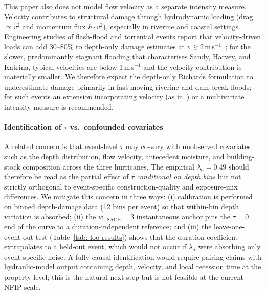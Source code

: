 This paper also does not model flow velocity as a separate intensity measure. Velocity contributes to structural damage through hydrodynamic loading (drag $\propto v^2$ and momentum flux $h \cdot v^2$), especially in riverine and coastal settings. Engineering studies of flash-flood and torrential events report that velocity-driven loads can add 30--80\% to depth-only damage estimates at $v \gtrsim 2$\,m\,s$^{-1}$~\cite{santangelo2021landslides, fahad2020coupled, fahad2022decision}; for the slower, predominantly stagnant flooding that characterises Sandy, Harvey, and Katrina, typical velocities are below 1\,m\,s$^{-1}$ and the velocity contribution is materially smaller. We therefore expect the depth-only Richards formulation to underestimate damage primarily in fast-moving riverine and dam-break floods; for such events an extension incorporating velocity (as in~\cite{merz2010review}) or a multivariate intensity measure is recommended.

\paragraph{Identification of $\tau$ vs.\ confounded covariates}
A related concern is that event-level $\tau$ may co-vary with unobserved covariates such as the depth distribution, flow velocity, antecedent moisture, and building-stock composition across the three hurricanes. The empirical $\lambda_a = 0.49$ should therefore be read as the partial effect of $\tau$ \emph{conditional on depth bins} but not strictly orthogonal to event-specific construction-quality and exposure-mix differences. We mitigate this concern in three ways: (i) calibration is performed on binned depth-damage data (12 bins per event) so that within-bin depth variation is absorbed; (ii) the $w_{\text{USACE}} = 3$ instantaneous anchor pins the $\tau = 0$ end of the curve to a duration-independent reference; and (iii) the leave-one-event-out test (Table~\ref{tab: loo results}) shows that the duration coefficient extrapolates to a held-out event, which would not occur if $\lambda_a$ were absorbing only event-specific noise. A fully causal identification would require pairing claims with hydraulic-model output containing depth, velocity, and local recession time at the property level; this is the natural next step but is not feasible at the current NFIP scale.

